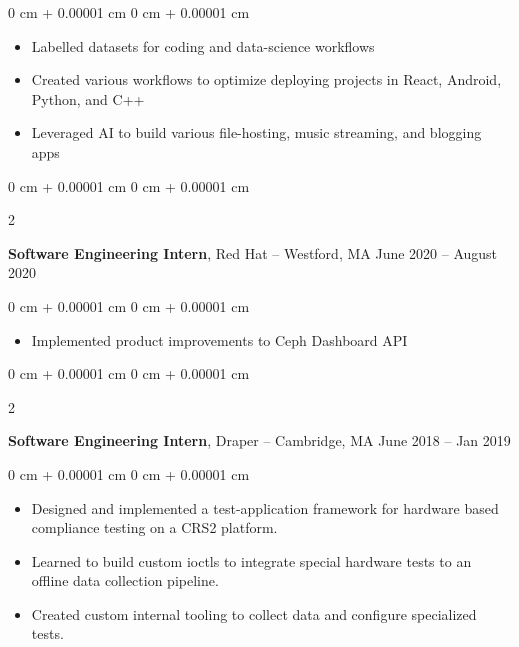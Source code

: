 \documentclass[10pt, letterpaper]{article}
\newenvironment{highlights}{
    \begin{itemize}[
        topsep=0.10 cm,
        parsep=0.10 cm,
        partopsep=0pt,
        itemsep=0pt,
        leftmargin=0 cm + 10pt
    ]
}{
    \end{itemize}
} %
\newenvironment{onecolentry}{
    \begin{adjustwidth}{
        0 cm + 0.00001 cm
    }{
        0 cm + 0.00001 cm
    }
}{
    \end{adjustwidth}
} %
\newenvironment{twocolentry}[2][]{
    \onecolentry
    \def\secondColumn{#2}
    \setcolumnwidth{\fill, 6.0 cm}
    \begin{paracol}{2}
}{
    \switchcolumn \raggedleft \secondColumn
    \end{paracol}
    \endonecolentry
} %
\begin{document}
        \vspace{0.10 cm}
        \begin{onecolentry}
            \begin{highlights}
                \item Labelled datasets for coding and data-science workflows
                \item Created various workflows to optimize deploying projects in React, Android, Python, and C++
                \item Leveraged AI to build various file-hosting, music streaming, and blogging apps
            \end{highlights}
        \end{onecolentry}


        \vspace{0.2 cm}

        \begin{twocolentry}{
            June 2020 – August 2020
        }
            \textbf{Software Engineering Intern}, Red Hat -- Westford, MA\end{twocolentry}

        \vspace{0.10 cm}
        \begin{onecolentry}
            \begin{highlights}
                \item Implemented product improvements to Ceph Dashboard API
            \end{highlights}
        \end{onecolentry}


        \vspace{0.2 cm}

        \begin{twocolentry}{
            June 2018 – Jan 2019
        }
            \textbf{Software Engineering Intern}, Draper -- Cambridge, MA\end{twocolentry}

        \vspace{0.10 cm}
        \begin{onecolentry}
            \begin{highlights}
              \item Designed and implemented a test-application framework for hardware based compliance testing on a CRS2 platform.
              \item Learned to build custom ioctls to integrate special hardware tests to an offline data collection pipeline.
              \item Created custom internal tooling to collect data and configure specialized tests.
            \end{highlights}
        \end{onecolentry}
\end{document}
